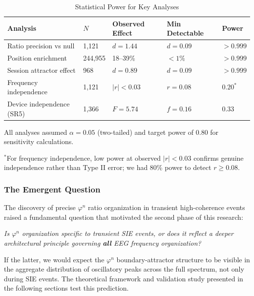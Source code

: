 \documentclass[11pt,a4paper]{article}
\newcommand{\phisym}{\varphi}
\begin{document}
\begin{table}[H]
\centering
\caption{Statistical Power for Key Analyses}
\label{tab:power_analysis}
\begin{tabular}{@{}lllll@{}}
\toprule
Analysis & $N$ & Observed Effect & Min Detectable & Power \\
\midrule
Ratio precision vs null & 1,121 & $d = 1.44$ & $d = 0.09$ & $>0.999$ \\
Position enrichment & 244,955 & 18--39\% & $<1\%$ & $>0.999$ \\
Session attractor effect & 968 & $d = 0.89$ & $d = 0.09$ & $>0.999$ \\
Frequency independence & 1,121 & $|r| < 0.03$ & $r = 0.08$ & $0.20^*$ \\
Device independence (SR5) & 1,366 & $F = 5.74$ & $f = 0.16$ & $0.33$ \\
\bottomrule
\end{tabular}
\begin{tablenotes}
\small
\item All analyses assumed $\alpha = 0.05$ (two-tailed) and target power of 0.80 for sensitivity calculations.
\item $^*$For frequency independence, low power at observed $|r| < 0.03$ confirms genuine independence rather than Type II error; we had 80\% power to detect $r \geq 0.08$.
\end{tablenotes}
\end{table}

\subsubsection{The Emergent Question}
The discovery of precise $\phisym^n$ ratio organization in transient high-coherence events raised a fundamental question that motivated the second phase of this research:

\textit{Is $\phisym^n$ organization specific to transient SIE events, or does it reflect a deeper architectural principle governing \textbf{all} EEG frequency organization?}

If the latter, we would expect the $\phisym^n$ boundary-attractor structure to be visible in the aggregate distribution of oscillatory peaks across the full spectrum, not only during SIE events. The theoretical framework and validation study presented in the following sections test this prediction.

\end{document}
